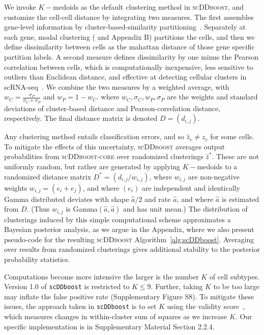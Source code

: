 \documentclass[aoas,preprint]{imsart}
\begin{document}
We invoke $K-$medoids \citep{kmedoids} 
as the default clustering method in \textsc{scDDboost}, and customize the cell-cell distance by integrating two measures.  
The first assembles gene-level information by cluster-based-similarity partitioning~\citep{ref:cspa}.
 Separately at each gene,   modal clustering (\cite{ref:dahl} and Appendix B) partitions the cells, and
then we define dissimilarity between cells as the mahattan distance of those gene specific partition labels.
A second measure defines dissimilarity by one minus the 
Pearson correlation between cells, which is computationally inexpensive,
less sensitive to outliers than Euclidean distance, and effective at detecting cellular clusters in 
scRNA-seq~\citep{Cor}.
 We combine the two measures by a weighted average, 
with  $w_C = \frac{\sigma_P}{\sigma_C + \sigma_P}$ and $w_P = 1 - w_C$. where $w_C,\sigma_C, w_P, \sigma_P$ are the weights and standard deviations of cluster-based distance and Pearson-correlation distance, respectively.
The final distance matrix is denoted $D=\left( d_{i,j} \right)$. 

Any clustering method  entails classification errors, and so $\hat z_c \neq z_c$ for some cells. To mitigate
the effects of this uncertainty, \textsc{scDDboost} averages output probabilities from \textsc{scDDboost-core} over
randomized clusterings $\hat z^*$.  These are not uniformly random, but rather are generated by applying $K-$medoids
to a randomized distance matrix $D^*=\left( d_{i,j}/ w_{i,j}\right)$, 
where $w_{i,j}$ are   non-negative weights
$w_{i,j} = ( e_i + e_j )$, and where $( e_i) $ are independent and identically 
Gamma distributed deviates with shape $\hat a/2$  and rate $\hat a$, 
and where $\hat a$ is estimated from $D$. (Thus $w_{i,j}$ is Gamma$(\hat a, \hat a)$ and has unit mean.)  
The distribution of
clusterings induced by this simple computational 
scheme approximates a Bayesian posterior analysis, as we argue in
the Appendix, where we also present pseudo-code for the resulting \textsc{scDDboost} 
Algorithm~\ref{alg:scDDboost}.
Averaging over results from randomized clusterings 
 gives additional stability to the posterior probability statistics.


Computations become more intensive the larger is the number $K$ of cell subtypes. Version 1.0 of 
\verb+scDDboost+ is restricted to $K\leq 9$. Further, 
 taking $K$ to be too large may inflate the false positive rate (Supplementary Figure S8).
 To mitigate these issues, the approach
taken in \verb+scDDboost+ is to set $K$ using the validity score~\citep{selK}, which measures 
changes in within-cluster sum of squares as we increase $K$.  Our specific implementation is in
Supplementary Material Section 2.2.4.
\end{document}

